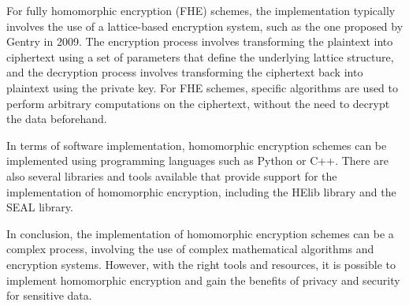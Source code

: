\documentclass[a4paper,11pt]{report}
\begin{document}
For fully homomorphic encryption (FHE) schemes, the implementation typically involves the use of a lattice-based encryption system, such as the one proposed by Gentry in 2009. The encryption process involves transforming the plaintext into ciphertext using a set of parameters that define the underlying lattice structure, and the decryption process involves transforming the ciphertext back into plaintext using the private key. For FHE schemes, specific algorithms are used to perform arbitrary computations on the ciphertext, without the need to decrypt the data beforehand.

In terms of software implementation, homomorphic encryption schemes can be implemented using programming languages such as Python or C++. There are also several libraries and tools available that provide support for the implementation of homomorphic encryption, including the HElib library and the SEAL library.

In conclusion, the implementation of homomorphic encryption schemes can be a complex process, involving the use of complex mathematical algorithms and encryption systems. However, with the right tools and resources, it is possible to implement homomorphic encryption and gain the benefits of privacy and security for sensitive data.
\end{document}
